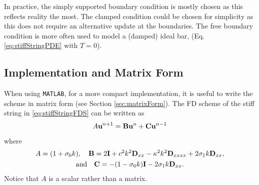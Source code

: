 
In practice, the simply supported boundary condition is mostly chosen as this reflects reality the most. The clamped condition could be chosen for simplicity as this does not require an alternative update at the boundaries. The free boundary condition is more often used to model a (damped) ideal bar, (Eq. \eqref{eq:stiffStringPDE} with $T = 0$).

\subsection{Implementation and Matrix Form}\label{sec:implementationStiffString}
When using \texttt{MATLAB}, for a more compact implementation, it is useful to write the scheme in matrix form (see Section \ref{sec:matrixForm}). The FD scheme of the stiff string in \eqref{eq:stiffStringFDS} can be written as 
\begin{equation}\label{eq:matrixFormStiffString}
    A\mathbf{u}^{n+1} = \mathbf{B}\mathbf{u}^n + \mathbf{C} \mathbf{u}^{n-1}
\end{equation}
where 
\begin{equation*}
    \begin{gathered}
    A = (1+\sigma_{0} k), \quad \mathbf{B} = 2\mathbf{I} + c^2 k^2 \mathbf{D}_{xx} - \kappa^2 k^2 \mathbf{D}_{xxxx} + 2 \sigma_{1} k \mathbf{D}_{xx}, \\
    \text{and} \quad \mathbf{C} = -(1-\sigma_{0} k)\mathbf{I} - 2\sigma_{1} k \mathbf{D}_{xx}.
    \end{gathered}
\end{equation*}
Notice that $A$ is a scalar rather than a matrix.

